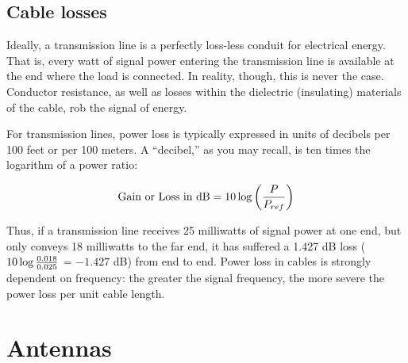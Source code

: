 \filbreak
\subsection{Cable losses}

Ideally, a transmission line is a perfectly loss-less conduit for electrical energy.  That is, every watt of signal power entering the transmission line is available at the end where the load is connected.  In reality, though, this is never the case.  Conductor resistance, as well as losses within the dielectric (insulating) materials of the cable, rob the signal of energy.

For transmission lines, power loss is typically expressed in units of decibels per 100 feet or per 100 meters.  A ``decibel,'' as you may recall, is ten times the logarithm of a power ratio:    

$$\hbox{Gain or Loss in dB} = 10 \log \left({P \over P_{ref}}\right)$$

Thus, if a transmission line receives 25 milliwatts of signal power at one end, but only conveys 18 milliwatts to the far end, it has suffered a 1.427 dB loss ($10 \log {0.018 \over 0.025}$ = $-1.427$ dB) from end to end.  Power loss in cables is strongly dependent on frequency: the greater the signal frequency, the more severe the power loss per unit cable length.



















\filbreak
\section{Antennas}

\label{antenna}

